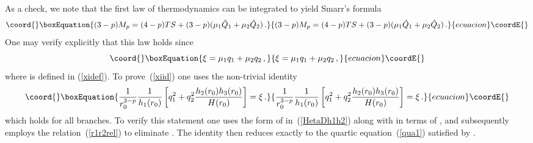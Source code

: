\documentclass[a4paper,11pt]{article}
\providecommand{\eqref}[1]{(\ref{#1})}
\begin{document}
As a check, we note that the first law of thermodynamics
\coordHE{} can be integrated to yield Smarr's formula
%
\begin{equation}\coord{}\boxEquation{
(3-p) M_p = (4-p) TS + (3-p)(\mu_1 \hat{Q}_1 + \mu_2 \hat{Q}_2) \,.
}{
(3-p) M_p = (4-p) TS + (3-p)(\mu_1 \hat{Q}_1 + \mu_2 \hat{Q}_2) \,.
}{ecuacion}\coordE{}\end{equation}
%
One may verify explicitly that this law holds since
%
\begin{equation}\coord{}\boxEquation{
\label{xiid}
\xi = \mu_1 q_1 + \mu_2 q_2 \,,
}{
\xi = \mu_1 q_1 + \mu_2 q_2 \,,
}{ecuacion}\coordE{}\end{equation}
%
where \myHighlight{$\xi $}\coordHE{} is defined in \eqref{xidef}. To prove~\eqref{xiid} one
uses the non-trivial identity
\begin{equation}\coord{}\boxEquation{
\label{ntid}
\frac{1}{r_0^{3-p}} \frac{1}{h_1(r_0)} \left[ q_1^2 + q_2^2
\frac{h_2(r_0) h_3 (r_0)}{H(r_0)} \right] = \xi \,.
}{
\frac{1}{r_0^{3-p}} \frac{1}{h_1(r_0)} \left[ q_1^2 + q_2^2
\frac{h_2(r_0) h_3 (r_0)}{H(r_0)} \right] = \xi \,.
}{ecuacion}\coordE{}\end{equation}
which holds for all branches. To verify this statement one uses the
form of \coordHE{} in~\eqref{HetaDh1h2} along with \coordHE{} in terms of \coordHE{},
and subsequently employs the relation~\eqref{r1r2rel} to eliminate \coordHE{}.
The identity then reduces exactly to the quartic equation~\eqref{qua1}
satisfied by \coordHE{}.




\vspace{1ex}

\end{document}
